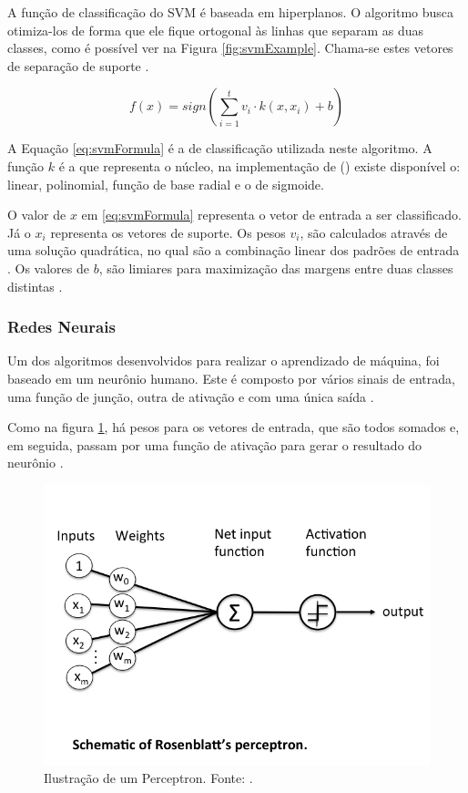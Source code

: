 A função de classificação do SVM é baseada em hiperplanos. O algoritmo busca otimiza-los de forma que ele fique ortogonal às linhas que separam as duas classes, como é possível ver na Figura \ref{fig:svmExample}. Chama-se estes vetores de separação de suporte \cite{SMOLA2004}.

\begin{equation} \label{eq:svmFormula}
	f(x) = sign(\sum_{i=1}^{t} v_i \cdot k(x, x_i) + b)
\end{equation}

A Equação \ref{eq:svmFormula} é a de classificação utilizada neste algoritmo. A função $k$ é a que representa o núcleo, na implementação de \citeauthor{PEDREGOSA2011} (\citeyear{PEDREGOSA2011}) existe disponível o: linear, polinomial, função de base radial e o de sigmoide.

O valor de $x$ em \ref{eq:svmFormula} representa o vetor de entrada a ser classificado. Já o $x_{i}$ representa os vetores de suporte. Os pesos $v_{i}$, são calculados através de uma solução quadrática, no qual são a combinação linear dos padrões de entrada \cite{SMOLA2004}. Os valores de $b$, são limiares para maximização das margens entre duas classes distintas \cite{HEARST1995}.

\subsubsection{Redes Neurais}

Um dos algoritmos desenvolvidos para realizar o aprendizado de máquina, foi baseado em um neurônio humano. Este é composto por vários sinais de entrada, uma função de junção, outra de ativação e com uma única saída \cite{GOLDBERG2017}.

Como na figura \ref{fig:perceptron}, há pesos para os vetores de entrada, que são todos somados e, em seguida, passam por uma função de ativação para gerar o resultado do neurônio \cite{RASCHKA2015}.

\begin{figure}[h]
	\centering
    \includegraphics[keepaspectratio=true,scale=0.5]{figuras/perceptronSchematic}
	\caption[Ilustração Perceptron]{Ilustração de um Perceptron. Fonte: 
\cite{RASCHKA2015}.}
	\label{fig:perceptron}
\end{figure}


